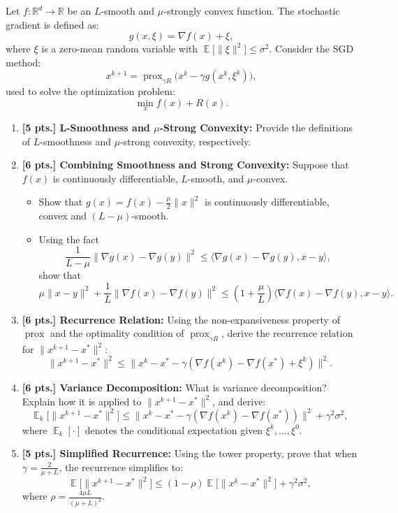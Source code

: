 \documentclass[11pt,a4paper]{article}
\DeclareMathOperator{\E}{\mathbb{E}}
\DeclareMathOperator{\prox}{prox}
\begin{document}
Let $f : \mathbb{R}^d \to \mathbb{R}$ be an $L$-smooth and $\mu$-strongly convex function. The stochastic gradient is defined as:
\[
g(x, \xi) = \nabla f(x) + \xi,
\]
where $\xi$ is a zero-mean random variable with $\E \bigl[ \|\xi\|^2 \bigr] \le \sigma^2$. Consider the SGD method:
\[
x^{k+1} = \prox_{\gamma R} \bigl( x^k - \gamma g(x^k, \xi^k) \bigr),
\]
used to solve the optimization problem:
\[
\min_{x} f(x) + R(x).
\]

\begin{enumerate}[label=\textbf{\arabic*.}]
    \item \textbf{[5 pts.] L-Smoothness and $\mu$-Strong Convexity:} Provide the definitions of $L$-smoothness and $\mu$-strong convexity, respectively.

    \item \textbf{[6 pts.] Combining Smoothness and Strong Convexity:} Suppose that $f(x)$ is continuously differentiable, $L$-smooth, and $\mu$-convex.
    \begin{itemize}
        \item Show that $g(x) = f(x) - \frac{\mu}{2}\|x\|^2$ is continuously differentiable, convex and $(L - \mu)$-smooth.
        \item Using the fact
        \[
        \frac{1}{L - \mu} \|\nabla g(x) - \nabla g(y)\|^2 \le \langle \nabla g(x) - \nabla g(y), x - y \rangle,
        \]
        show that
        \[
        \mu \|x - y\|^2 + \frac{1}{L} \|\nabla f(x) - \nabla f(y)\|^2 \le \left(1 + \frac{\mu}{L}\right) \langle \nabla f(x) - \nabla f(y), x - y \rangle.
        \]
    \end{itemize}

    \item \textbf{[6 pts.] Recurrence Relation:} Using the non-expansiveness property of $\prox$ and the optimality condition of $\prox_{\gamma R}$, derive the recurrence relation for $\|x^{k+1} - x^*\|^2$:
    \[
    \|x^{k+1} - x^*\|^2 \le \|x^k - x^* - \gamma (\nabla f(x^k) - \nabla f(x^*) + \xi^k)\|^2.
    \]

    \item \textbf{[6 pts.] Variance Decomposition:} What is variance decomposition? Explain how it is applied to $\|x^{k+1} - x^*\|^2$, and derive:
    \[
    \E_k \bigl[ \|x^{k+1} - x^*\|^2 \bigr] \le \|x^k - x^* - \gamma (\nabla f(x^k) - \nabla f(x^*))\|^2 + \gamma^2 \sigma^2,
    \]
    where $\E_k[\cdot]$ denotes the conditional expectation given $\xi^k, \dots, \xi^0$.

    \item \textbf{[5 pts.] Simplified Recurrence:} Using the tower property, prove that when $\gamma = \frac{2}{\mu + L}$, the recurrence simplifies to:
    \[
    \E \bigl[ \|x^{k+1} - x^*\|^2 \bigr] \le (1 - \rho) \E \bigl[ \|x^k - x^*\|^2 \bigr] + \gamma^2 \sigma^2,
    \]
    where $\rho = \frac{4\mu L}{(\mu + L)^2}$.


\end{enumerate}
\end{document}
